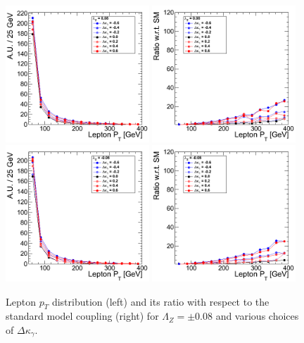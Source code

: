 \begin{figure}[h!t]
  {\centering
    \includegraphics[width=0.48\textwidth]{figs/LeptonpT_008.png}
    \includegraphics[width=0.48\textwidth]{figs/LeptonpT_008_ratio.png}
    \includegraphics[width=0.48\textwidth]{figs/LeptonpT_m008.png}
    \includegraphics[width=0.48\textwidth]{figs/LeptonpT_m008_ratio.png}
    \caption{Lepton $p_T$ distribution (left) and its ratio with respect to 
    the standard model coupling (right) for $\Lambda_Z = \pm 0.08$ and various choices of $\Delta{\kappa_\gamma}$.}
    \label{fig:ww_LeptonpT_atgcRatio008}}
\end{figure}
